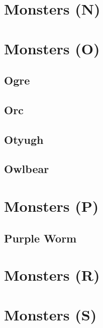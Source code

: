 \section{Monsters (N)}\label{sec:monsters-n}



\FloatBarrier
\section{Monsters (O)}\label{sec:monsters-o}
\subsection{Ogre}




\subsection{Orc}


\subsection{Otyugh}

\subsection{Owlbear}


\FloatBarrier
\section{Monsters (P)}\label{sec:monsters-p}





\subsection{Purple Worm}


\FloatBarrier
\section{Monsters (R)} \label{sec:monsters-r}


\FloatBarrier
\section{Monsters (S)} \label{sec:monsters-s}

